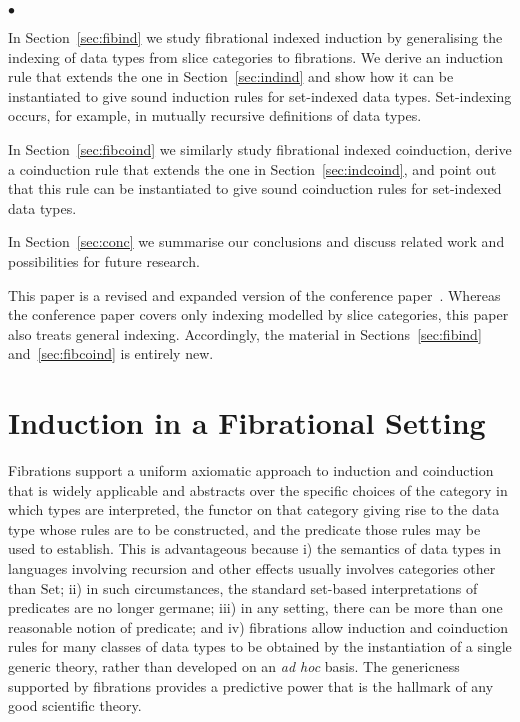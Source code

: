 \documentclass{LMCS}
\newcommand{\Set}{\mbox{Set}}
\theoremstyle{plain}
\theoremstyle{remark}
\theoremstyle{definition}
\begin{document}
\begin{iteMize}{$\bullet$}
\item In Section~\ref{sec:fibind} we study fibrational indexed
  induction by generalising the indexing of data types from slice
  categories to fibrations. We derive an induction rule that extends
  the one in Section~\ref{sec:indind} and show how it can be
  instantiated to give sound induction rules for set-indexed data
  types. Set-indexing occurs, for example, in mutually recursive
  definitions of data types.

\item In Section~\ref{sec:fibcoind} we similarly study fibrational
  indexed coinduction, derive a coinduction rule that extends the one
  in Section~\ref{sec:indcoind}, and point out that this rule can be
  instantiated to give sound coinduction rules for set-indexed data
  types.

\item In Section~\ref{sec:conc} we summarise our conclusions and
  discuss related work and possibilities for future research.
\end{iteMize}

\noindent This paper is a revised and expanded version of the conference
paper~\cite{fgj11}. Whereas the conference paper covers only indexing
modelled by slice categories, this paper also treats general
indexing. Accordingly, the material in Sections~\ref{sec:fibind}
and~\ref{sec:fibcoind} is entirely new.


\section{Induction in a Fibrational Setting}\label{sec:ind}

Fibrations support a uniform axiomatic approach to induction and
coinduction that is widely applicable and abstracts over the specific
choices of the category in which types are interpreted, the functor on
that category giving rise to the data type whose rules are to be
constructed, and the predicate those rules may be used to establish.
This is advantageous because i) the semantics of data types in
languages involving recursion and other effects usually involves
categories other than $\Set$; ii) in such circumstances, the standard
set-based interpretations of predicates are no longer germane; iii) in
any setting, there can be more than one reasonable notion of
predicate; and iv) fibrations allow induction and coinduction rules
for many classes of data types to be obtained by the instantiation of
a single generic theory, rather than developed on an {\em ad hoc}
basis. The genericness supported by fibrations provides a predictive
power that is the hallmark of any good scientific theory.
\end{document}
